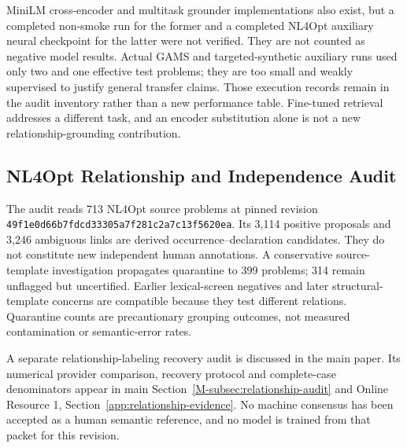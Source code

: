 MiniLM cross-encoder and multitask grounder implementations also exist, but a completed non-smoke run for the former and a completed NL4Opt auxiliary neural checkpoint for the latter were not verified. They are not counted as negative model results. Actual GAMS and targeted-synthetic auxiliary runs used only two and one effective test problems; they are too small and weakly supervised to justify general transfer claims. Those execution records remain in the audit inventory rather than a new performance table. Fine-tuned retrieval addresses a different task, and an encoder substitution alone is not a new relationship-grounding contribution.

\subsection{NL4Opt Relationship and Independence Audit}
\label{app:nl4opt-audit}

The audit reads 713 NL4Opt source problems at pinned revision \texttt{49f1e0d66b7fdcd33305a7f281c2a7c13f5620ea}. Its 3,114 positive proposals and 3,246 ambiguous links are derived occurrence--declaration candidates. They do not constitute new independent human annotations. A conservative source-template investigation propagates quarantine to 399 problems; 314 remain unflagged but uncertified. Earlier lexical-screen negatives and later structural-template concerns are compatible because they test different relations. Quarantine counts are precautionary grouping outcomes, not measured contamination or semantic-error rates.

A separate relationship-labeling recovery audit is discussed in the main paper. Its numerical provider comparison, recovery protocol and complete-case denominators appear in main Section~\ref{M-subsec:relationship-audit} and Online Resource 1, Section~\ref{app:relationship-evidence}. No machine consensus has been accepted as a human semantic reference, and no model is trained from that packet for this revision.
